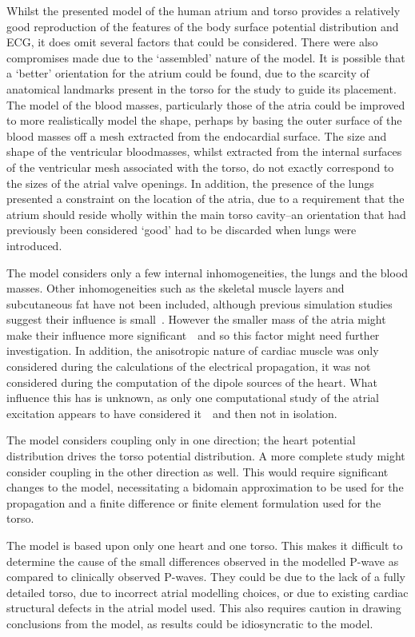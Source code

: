 Whilst the presented model of the human atrium and torso provides a relatively
good reproduction of the features of the body surface potential distribution and
ECG, it does omit several factors that could be considered.
There were also compromises made due to the `assembled' nature of the model.
It is possible that a `better' orientation for the atrium could be found, due to
the scarcity of anatomical landmarks present in the torso for the study to guide
its placement.
The model of the blood masses, particularly those of the atria could be improved
to more realistically model the shape, perhaps by basing the outer surface of
the blood masses off a mesh extracted from the endocardial surface.
The size and shape of the ventricular bloodmasses, whilst extracted from the
internal surfaces of the ventricular mesh associated with the torso, do not
exactly correspond to the sizes of the atrial valve openings.
In addition, the presence of the lungs presented a constraint on the location of
the atria, due to a requirement that the atrium should reside wholly within the
main torso cavity--an orientation that had previously been considered `good' had
to be discarded when lungs were introduced.

The model considers only a few internal inhomogeneities, the lungs and the blood
masses.
Other inhomogeneities such as the skeletal muscle layers and subcutaneous fat
have not been included, although previous simulation studies suggest their
influence is small~\cite{Klepfer1997}.
However the smaller mass of the atria might make their influence more
significant~\cite{vanDam2005}\ and so this factor might need further
investigation.
In addition, the anisotropic nature of cardiac muscle was only considered during
the calculations of the electrical propagation, it was not considered during the
computation of the dipole sources of the heart.
What influence this has is unknown, as only one computational study of the
atrial excitation appears to have considered it~\cite{Seger2004}\ and then not in
isolation.

The model considers coupling only in one direction; the heart potential
distribution drives the torso potential distribution.
A more complete study might consider coupling in the other direction as well.
This would require significant changes to the model, necessitating a bidomain
approximation to be used for the propagation and a finite difference or finite
element formulation used for the torso.

The model is based upon only one heart and one torso.
This makes it difficult to determine the cause of the small differences observed in
the modelled  P-wave as compared to clinically observed P-waves.
They could be due to the lack of a fully detailed torso, due to incorrect atrial
modelling choices, or due to existing cardiac structural defects in the atrial
model used.
This also requires caution in drawing conclusions from the model, as results
could be idiosyncratic to the model.

